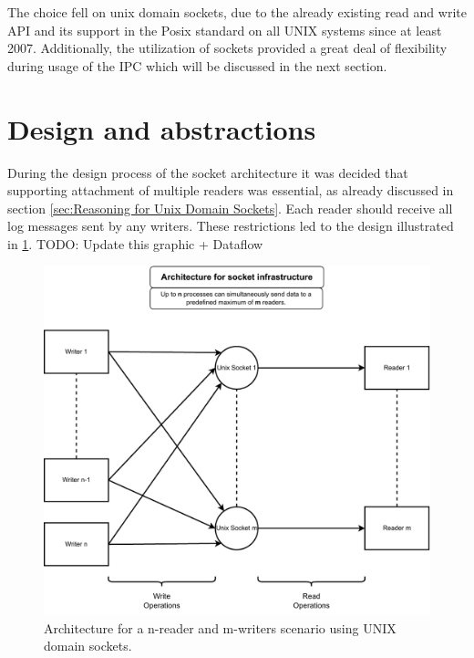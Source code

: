 The choice fell on unix domain sockets, due to the already existing read and write API and its support in the Posix standard on all UNIX systems since at least 2007\cite{posix}.
Additionally, the utilization of sockets provided a great deal of flexibility during usage of the IPC which will be discussed in the next section.

\section{Design and abstractions}
\label{sec:Design_and_abstractions}
During the design process of the socket architecture it was decided that supporting attachment of multiple readers was essential, as already discussed in section \ref{sec:Reasoning for Unix Domain Sockets}.
Each reader should receive all log messages sent by any writers.
These restrictions led to the design illustrated in \ref{fig:socket:architecture}. TODO: Update this graphic + Dataflow

\begin{figure}[h!]
    \centerline{\includegraphics[width=1.2\textwidth]{images/SocketArchitecture.pdf}}
    \caption[General design of socket architecture]{
        Architecture for a n-reader and m-writers scenario using UNIX domain sockets.}
	\label{fig:socket:architecture}
\end{figure}

